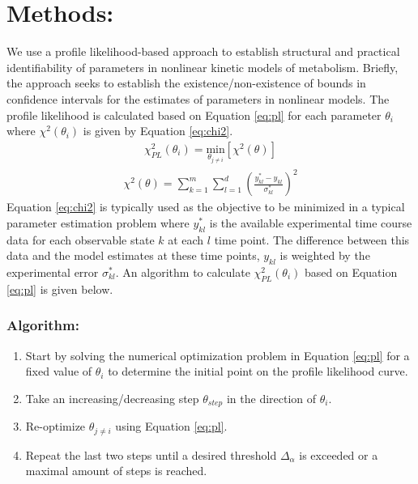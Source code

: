 \documentclass[10pt]{report}
\begin{document}
	\section{Methods:}
	We use a profile likelihood-based approach to establish structural and practical identifiability of parameters in nonlinear kinetic models of metabolism. Briefly, the approach seeks to establish the existence/non-existence of bounds in confidence intervals for the estimates of parameters in nonlinear models. The profile likelihood is calculated based on Equation \ref{eq:pl} for each parameter $\theta_i$ where $\chi^2(\theta_i)$ is given by Equation \ref{eq:chi2}.
	\begin{align}\label{eq:pl}
	\chi_{PL}^2(\theta_i) = \underset{\theta_{j\ne i}}{\mathrm{min}} \left[\chi^2(\theta)\right]
	\end{align}
	\begin{align}\label{eq:chi2}
	\chi^2(\theta) = \sum_{k=1}^{m}\sum_{l=1}^{d}\left(\frac{y_{kl}^*-y_{kl}}{\sigma_{kl}^*}\right)^2
	\end{align}
	Equation \ref{eq:chi2} is typically used as the objective to be minimized in a typical parameter estimation problem where $y_{kl}^*$ is the available experimental time course data for each observable state $k$ at each $l$ time point. The difference between this data and the model estimates at these time points, $y_{kl}$ is weighted by the experimental error $\sigma_{kl}^*$. An algorithm to calculate $\chi_{PL}^2(\theta_i)$ based on Equation \ref{eq:pl} is given below.
	
	\subsubsection{Algorithm:}	
	\begin{enumerate}
		\item Start by solving the numerical optimization problem in Equation \ref{eq:pl} for a fixed value of $\theta_i$ to determine the initial point on the profile likelihood curve.
		\item Take an increasing/decreasing step $\theta_{step}$ in the direction of $\theta_i$.
		\item Re-optimize $\theta_{j\ne i}$ using Equation \ref{eq:pl}.
		\item Repeat the last two steps until a desired threshold $\Delta_{\alpha}$ is exceeded or a maximal amount of steps is reached.
	\end{enumerate}
\end{document}
